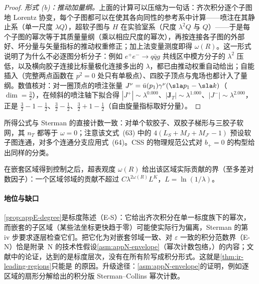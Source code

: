 \begin{proof}
\emph{形式 (b)：推动加量纲。}上面的计算可以压缩为一句话：齐次积分逐个子图地 Lorentz 协变，每个子图都可以在使其各向同性的参考系中计算——喷注在其静止系（单一尺度 $\lambda Q$），超软子图与 $H$ 在实验室系（尺度 $\lambda^2Q$ 与 $Q$）——于是每个子图的幂次等于其质量量纲（乘以相应尺度的幂次），再按连接各子图的外部好、坏分量与矢量指标的推动权重修正；加上法变量测度即得 $\omega(R)$。这一形式说明了为什么不必逐图分析分子：例如 $e^+e^-\to q\bar qg$ 共线区中模方分子的 $\lambda^2$ 压低，以及横向胶子连接比标量极化连接多出的 $\lambda$，都已由推动权重自动给出；自能插入（完整两点函数在 $p^2=0$ 处只有单极点\cite[第~2.4~节]{Sterman:1995fz}）、四胶子顶点与鬼场也都计入了量纲。数值核对：对一圈顶点的喷注张量 $J^\nu=\bar u(p_1)\gamma^\nu(\sla p_1-\sla k)$（$\dim=\frac32$），在倾斜的喷注轴下拟合得 $|J^+|\sim\lambda^{0.000}$、$|\mathbf J_T|\sim\lambda^{1.000}$、$|J^-|\sim\lambda^{2.000}$，正是 $\frac32-1-\frac12$、$\frac32-\frac12$、$\frac32+1-\frac12$（自由旋量指标取好分量）。
\end{proof}

所得公式与 Sterman 的直接计数\cite[式~(64)]{Sterman:1995fz}一致：对单个软胶子、双胶子梯形与三胶子软网，其 $n_T$ 都等于 $\omega=0$；注意该文式~(63) 中的 $4(L_S+M_J+M_{J'}-1)$ 预设软子图连通，对多个连通分支应用式~(64)。CSS 的物理规范公式\cite[式~(143)]{CollinsSoperSterman1989}对 $b_+=0$ 的构型给出同样的分类。

\begin{remark}\label{rem:appE-actual-bound}
在嵌套区域得到控制之后，超表观度 $\omega(R)$ 给出该区域实际贡献的界（至多差对数因子）：一个区域邻域的贡献不超过 $C\lambda^{2\omega(R)}L^K$，$L=\ln(1/\lambda)$。
\end{remark}

\paragraph{地位与缺口}
\cref{prop:appE-degree}是标度陈述（E-S）：它给出齐次积分在单一标度族下的幂次，而嵌套的子区域（某些法坐标更快趋于零）可能使实际行为偏离，Sterman 的第 iv 步要求逐层检查它们\cite[第~2.3~节]{Sterman:1995fz}。把它化为对嵌套邻域一致、对 $\varepsilon$ 一致的积分范数界（E-N）恰是附录~N 的技术性假设\cref{asm:appN-envelope}（幂次计数包络，\tagA）的内容；文献中的论证\cite{Sterman1978a,LibbySterman1978a}，\cite[第~5~章]{Collins2011}达到的是标度层次，没有在所有阶写成积分形式。这就是\cref{thm:ir-leading-regions}只能是 \tagA 的原因。升级途径：\cref{asm:appN-envelope}的证明，例如逐区域的扇形分解给出的积分版 Sterman--Collins 幂次计数。


